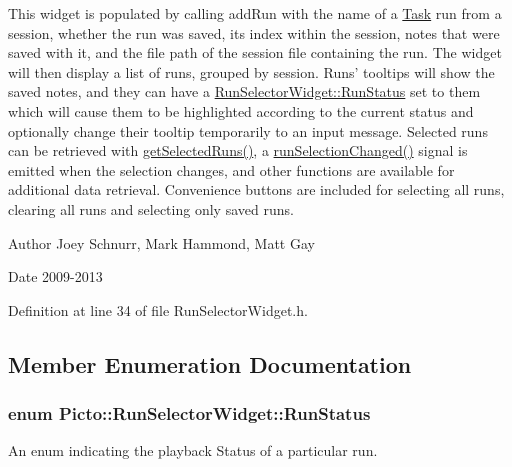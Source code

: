 This widget is populated by calling add\-Run with the name of a \hyperlink{class_picto_1_1_task}{Task} run from a session, whether the run was saved, its index within the session, notes that were saved with it, and the file path of the session file containing the run. The widget will then display a list of runs, grouped by session. Runs' tooltips will show the saved notes, and they can have a \hyperlink{class_picto_1_1_run_selector_widget_ac540ab59a379b3bfb5534ecde54dc2aa}{Run\-Selector\-Widget\-::\-Run\-Status} set to them which will cause them to be highlighted according to the current status and optionally change their tooltip temporarily to an input message. Selected runs can be retrieved with \hyperlink{class_picto_1_1_run_selector_widget_aaa8edb495220c3474ddb50a779dd9a7b}{get\-Selected\-Runs()}, a \hyperlink{class_picto_1_1_run_selector_widget_a49bd945e717287fefe6efe75f1c6b7fb}{run\-Selection\-Changed()} signal is emitted when the selection changes, and other functions are available for additional data retrieval. Convenience buttons are included for selecting all runs, clearing all runs and selecting only saved runs. \begin{DoxyAuthor}{Author}
Joey Schnurr, Mark Hammond, Matt Gay 
\end{DoxyAuthor}
\begin{DoxyDate}{Date}
2009-\/2013 
\end{DoxyDate}


Definition at line 34 of file Run\-Selector\-Widget.\-h.



\subsection{Member Enumeration Documentation}
\hypertarget{class_picto_1_1_run_selector_widget_ac540ab59a379b3bfb5534ecde54dc2aa}{
\subsubsection[{Run\-Status}]{\setlength{\rightskip}{0pt plus 5cm}enum {\bf Picto\-::\-Run\-Selector\-Widget\-::\-Run\-Status}}}\label{class_picto_1_1_run_selector_widget_ac540ab59a379b3bfb5534ecde54dc2aa}


An enum indicating the playback Status of a particular run. 

